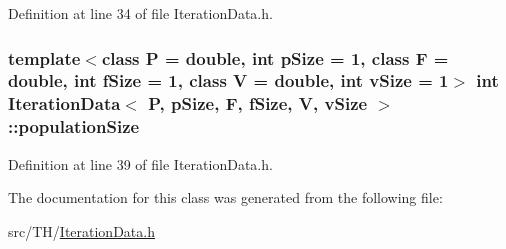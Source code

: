 Definition at line 34 of file Iteration\+Data.\+h.

\subsubsection[{\texorpdfstring{population\+Size}{populationSize}}]{\setlength{\rightskip}{0pt plus 5cm}template$<$class P = double, int p\+Size = 1, class F = double, int f\+Size = 1, class V = double, int v\+Size = 1$>$ int {\bf Iteration\+Data}$<$ P, p\+Size, F, f\+Size, V, v\+Size $>$\+::population\+Size}\hypertarget{structIterationData_a8bd76977404cbdfc9ab671c566aed418}{}\label{structIterationData_a8bd76977404cbdfc9ab671c566aed418}


Definition at line 39 of file Iteration\+Data.\+h.



The documentation for this class was generated from the following file\+:\begin{DoxyCompactItemize}
\item 
src/\+T\+H/\hyperlink{IterationData_8h}{Iteration\+Data.\+h}\end{DoxyCompactItemize}
